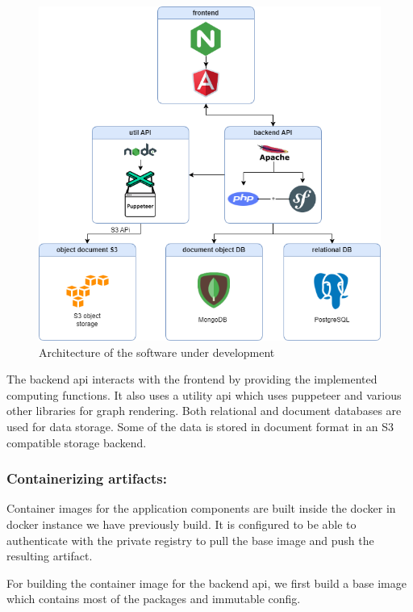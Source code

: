 \begin{figure}[H]\centering
\includegraphics[width=1.0\textwidth,angle=00]{assets/f47.png}
\caption{Architecture of the software under development}
\label{fig:Architecture of the software under development}
\end{figure}

The backend api interacts with the frontend by providing the implemented computing functions. It also uses a utility api which uses puppeteer and various other libraries for graph rendering. Both relational and document databases are used for data storage. Some of the data is stored in document format in an S3 compatible storage backend.

\subsubsection{Containerizing artifacts:}

Container images for the application components are built inside the docker in docker instance we have previously build. It is configured to be able to authenticate with the private registry to pull the base image and push the resulting artifact. 


For building the container image for the backend api, we first build a base image which contains most of the packages and immutable config. 

